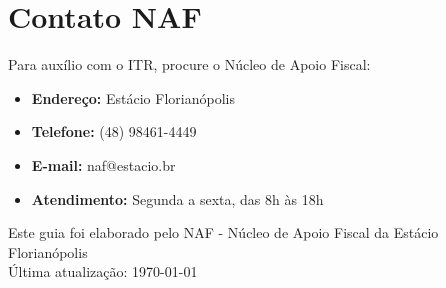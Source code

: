 \documentclass[12pt,a4paper]{article}
\begin{document}
\section{Contato NAF}

Para auxílio com o ITR, procure o Núcleo de Apoio Fiscal:

\begin{itemize}
    \item \textbf{Endereço:} Estácio Florianópolis
    \item \textbf{Telefone:} (48) 98461-4449
    \item \textbf{E-mail:} naf@estacio.br
    \item \textbf{Atendimento:} Segunda a sexta, das 8h às 18h
\end{itemize}

\vfill
\begin{center}
\footnotesize
Este guia foi elaborado pelo NAF - Núcleo de Apoio Fiscal da Estácio Florianópolis\\
Última atualização: \today
\end{center}
\end{document}
